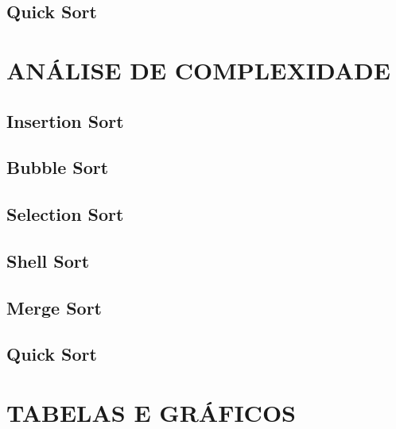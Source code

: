\documentclass[12pt,a4paper]{article}
\begin{document}
\subsection{Quick Sort}


\newpage


\section{ANÁLISE DE COMPLEXIDADE}

\subsection{Insertion Sort}


\subsection{Bubble Sort}


\subsection{Selection Sort}


\subsection{Shell Sort}


\subsection{Merge Sort}


\subsection{Quick Sort}


\newpage


\section{TABELAS E GRÁFICOS}
\end{document}
